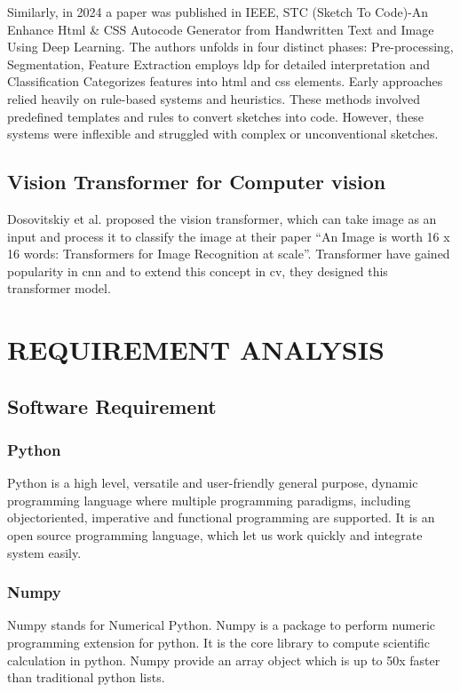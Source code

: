 \documentclass{ioereport}
\begin{document}
Similarly, in 2024 a paper was published in IEEE, STC (Sketch To Code)-An Enhance Html \& CSS Autocode Generator from Handwritten Text and Image Using Deep Learning. The authors unfolds in four distinct phases: Pre-processing, Segmentation,
Feature Extraction employs \gls{ldp} for detailed interpretation
and Classification Categorizes features into \gls{html} and \gls{css} elements. Early
approaches relied heavily on rule-based systems and heuristics. These methods
involved predefined templates and rules to convert sketches into code. However, these
systems were inflexible and struggled with complex or unconventional sketches. \cite{10537336}
\subsection{Vision Transformer for Computer vision}
Dosovitskiy et al. proposed the vision transformer, which can take image as an input
and process it to classify the image at their paper “An Image is worth 16 x 16 words:
Transformers for Image Recognition at scale”. Transformer have gained popularity in
\gls{cnn} and to extend this concept in \gls{cv}, they
designed this transformer model. \cite{dosovitskiy2021imageworth16x16words}
    \pagebreak

\section{\MakeUppercase{Requirement Analysis}}
    \subsection{Software Requirement}
    \subsubsection{Python}
    Python is a high level, versatile and user-friendly general purpose, dynamic
programming language where multiple programming paradigms, including objectoriented, imperative and functional programming are supported. It is an open source
programming language, which let us work quickly and integrate system easily.
\subsubsection{Numpy}
Numpy stands for Numerical Python. Numpy is a package to perform numeric
programming extension for python. It is the core library to compute scientific
calculation in python. Numpy provide an array object which is up to 50x faster than
traditional python lists.
\end{document}
